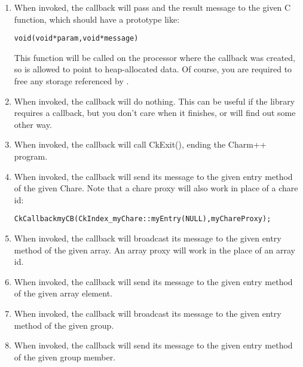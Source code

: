 \begin{enumerate}
\item {} When invoked, the
callback will pass  and the result message to the given C function,
which should have a prototype like:

\begin{alltt}
void (void *param,void *message)
\end{alltt}

This function will be called on the processor where the callback was created,
so  is allowed to point to heap-allocated data.  Of course, you
are required to free any storage referenced by .

\item {} When invoked, the callback
will do nothing.  This can be useful if the \charmpp{} library requires a callback,
but you don't care when it finishes, or will find out some other way.

\item {} When invoked, the callback
will call CkExit(), ending the Charm++ program.

\item {} When invoked, the 
callback will send its message to the given entry method of the given
Chare.  Note that a chare proxy will also work in place of a chare id:

\begin{alltt}
	CkCallback myCB(CkIndex_myChare::myEntry(NULL),myChareProxy);
\end{alltt}

\item {} 
When invoked,
the callback will broadcast its message to the given entry method
of the given array.  An array proxy will work in the place of an array id.

\item {}
When invoked,
the callback will send its message to the given entry method
of the given array element. 

\item {} 
When invoked,
the callback will broadcast its message to the given entry method
of the given group.

\item {}
When invoked,
the callback will send its message to the given entry method
of the given group member. 

\end{enumerate}

